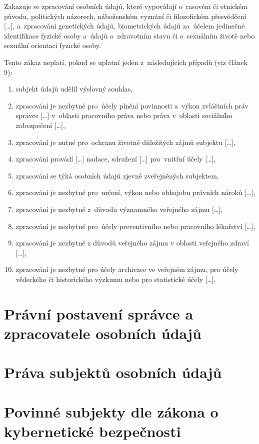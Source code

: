 Zakazuje se zpracování osobních údajů, které vypovídají o~rasovém či etnickém původu, politických názorech, náboženském vyznání či filozofickém přesvědčení [\dots], a~zpracování genetických údajů, biometrických údajů za~účelem jedinečné identifikace fyzické osoby a~údajů o~zdravotním stavu či o~sexuálním životě nebo sexuální orientaci fyzické osoby.

Tento zákaz neplatí, pokud se uplatní jeden z~následujících případů (viz článek 9):

\begin{enumerate}[label=\alph*)]
\item subjekt údajů udělil výslovný souhlas,
\item zpracování je nezbytné pro~účely plnění povinnosti a~výkon zvláštních práv správce [\dots] v~oblasti pracovního práva nebo práva v~oblasti sociálního zabezpečení [\dots],
\item zpracování je nutné pro~ochranu životně důležitých zájmů subjektu [\dots],
\item zpracování provádí [\dots] nadace, sdružení [\dots] pro~vnitřní účely [\dots],
\item zpracování se týká osobních údajů zjevně zveřejněných subjektem,
\item zpracování je nezbytné pro~určení, výkon nebo obhajobu právních nároků [\dots],
\item zpracování je nezbytné z~důvodu významného veřejného zájmu [\dots],
\item zpracování je nezbytné pro~účely preventivního nebo pracovního lékařství [\dots],
\item zpracování je nezbytné z důvodů veřejného zájmu v oblasti veřejného zdraví [\dots],
\item zpracování je nezbytné pro účely archivace ve veřejném zájmu, pro účely vědeckého či historického výzkumu nebo pro statistické účely [\dots].
\end{enumerate}

\clearpage
\section{Právní postavení správce a zpracovatele osobních údajů}

\clearpage
\section{Práva subjektů osobních údajů}

\clearpage
\section{Povinné subjekty dle zákona o kybernetické bezpečnosti}

